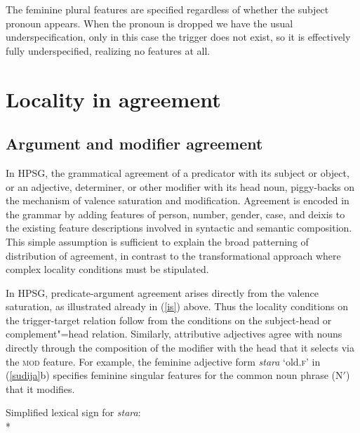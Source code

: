 \documentclass[output=paper
 	        ,biblatex
                ,babelshorthands
                ,newtxmath
                ,draftmode
                ,colorlinks, citecolor=brown
]{langscibook}
\begin{document}
\noindent
The feminine plural features are specified regardless of whether  the subject pronoun appears.  When the pronoun is dropped we have the usual underspecification, only in this case the trigger does not exist, so it is effectively fully underspecified, realizing no features at all.  


\section{Locality in agreement} 

\subsection{Argument and modifier agreement}
\label{arg-mod-agr}

In HPSG, the grammatical agreement of a predicator with its subject or object, or an adjective, determiner, or other modifier with its head noun, piggy-backs on the mechanism of valence saturation and modification.   Agreement is encoded in the grammar by adding features of person, number, gender, case, and deixis to the existing feature descriptions involved in syntactic and semantic composition.  This simple assumption is sufficient to explain the broad patterning of distribution of agreement, in contrast to the transformational approach where complex locality conditions must be stipulated.   

In HPSG, predicate-argument agreement arises directly from the  valence saturation, as illustrated already in (\ref{is}) above.  Thus the locality conditions on the trigger-target relation follow from the conditions on the subject-head or complement"=head relation.   Similarly, attributive adjectives agree with nouns directly through the composition of the modifier with the head that it selects via the \textsc{mod} feature.  For example, the  feminine adjective form \textit{stara} `old.\textsc{f}' in (\ref{sudija}b) specifies feminine singular features for the common noun phrase (N$'$) that it modifies.  

\begin{exe} 
\ex	\label{stara}  Simplified lexical sign for  \textit{stara}:\\*
\end{exe}
\end{document}
